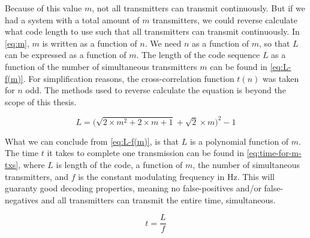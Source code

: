 Because of this value $m$, not all transmitters can transmit continuously.
But if we had a system with a total amount of $m$ transmitters, we could reverse calculate what code length to use such that all transmitters can transmit continuously.
In \autoref{eq:m}, $m$ is written as a function of $n$.
We need $n$ as a function of $m$, so that $L$ can be expressed as a function of $m$.
The length of the code sequence $L$ as a function of the number of simultaneous transmitters $m$ can be found in \autoref{eq:L-f(m)}.
For simplification reasons, the cross-correlation function $t(n)$ was taken for $n$ odd. 
The methods used to reverse calculate the equation is beyond the scope of this thesis.


\begin{equation}
	\label{eq:L-f(m)}
	L = \Bigg(\sqrt{2 \times m^2 + 2 \times m + 1} + \sqrt{2} \times m \Bigg)^2 - 1
\end{equation} 


What we can conclude from \autoref{eq:L-f(m)}, is that $L$ is a polynomial function of $m$.
The time $t$ it takes to complete one transmission can be found in \autoref{eq:time-for-m-txs}, where $L$ is length of the code, a function of $m$, the number of simultaneous transmitters, and $f$ is the constant modulating frequency in Hz.
This will guaranty good decoding properties, meaning no false-positives and/or false-negatives and all transmitters can transmit the entire time, simultaneous.

\begin{equation}
	\label{eq:time-for-m-txs}
	t = \frac{L}{f}
\end{equation}


